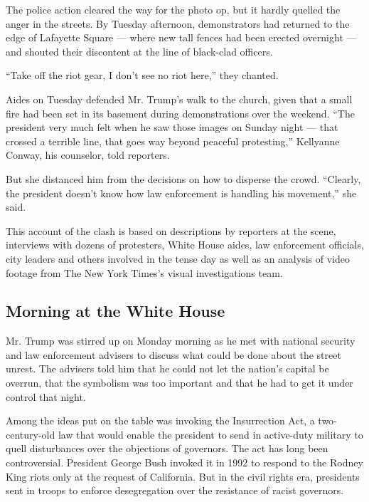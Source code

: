 The police action cleared the way for the photo op, but it hardly
quelled the anger in the streets. By Tuesday afternoon, demonstrators
had returned to the edge of Lafayette Square --- where new tall fences
had been erected overnight --- and shouted their discontent at the line
of black-clad officers.

``Take off the riot gear, I don't see no riot here,'' they chanted.

Aides on Tuesday defended Mr. Trump's walk to the church, given that a
small fire had been set in its basement during demonstrations over the
weekend. ``The president very much felt when he saw those images on
Sunday night --- that crossed a terrible line, that goes way beyond
peaceful protesting,'' Kellyanne Conway, his counselor, told reporters.

But she distanced him from the decisions on how to disperse the crowd.
``Clearly, the president doesn't know how law enforcement is handling
his movement,'' she said.

This account of the clash is based on descriptions by reporters at the
scene, interviews with dozens of protesters, White House aides, law
enforcement officials, city leaders and others involved in the tense day
as well as an analysis of video footage from The New York Times's visual
investigations team.

\hypertarget{morning-at-the-white-house}{%
\subsection{Morning at the White
House}\label{morning-at-the-white-house}}

Mr. Trump was stirred up on Monday morning as he met with national
security and law enforcement advisers to discuss what could be done
about the street unrest. The advisers told him that he could not let the
nation's capital be overrun, that the symbolism was too important and
that he had to get it under control that night.

Among the ideas put on the table was invoking the Insurrection Act, a
two-century-old law that would enable the president to send in
active-duty military to quell disturbances over the objections of
governors. The act has long been controversial. President George Bush
invoked it in 1992 to respond to the Rodney King riots only at the
request of California. But in the civil rights era, presidents sent in
troops to enforce desegregation over the resistance of racist governors.

